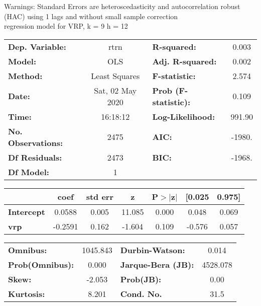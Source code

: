 Warnings: \newline
 [1] Standard Errors are heteroscedasticity and autocorrelation robust (HAC) using 1 lags and without small sample correction\\ 

regression model for VRP, k = 9 h = 12\begin{center}
\begin{tabular}{lclc}
\toprule
\textbf{Dep. Variable:}    &       rtrn       & \textbf{  R-squared:         } &     0.003   \\
\textbf{Model:}            &       OLS        & \textbf{  Adj. R-squared:    } &     0.002   \\
\textbf{Method:}           &  Least Squares   & \textbf{  F-statistic:       } &     2.574   \\
\textbf{Date:}             & Sat, 02 May 2020 & \textbf{  Prob (F-statistic):} &    0.109    \\
\textbf{Time:}             &     16:18:12     & \textbf{  Log-Likelihood:    } &    991.90   \\
\textbf{No. Observations:} &        2475      & \textbf{  AIC:               } &    -1980.   \\
\textbf{Df Residuals:}     &        2473      & \textbf{  BIC:               } &    -1968.   \\
\textbf{Df Model:}         &           1      & \textbf{                     } &             \\
\bottomrule
\end{tabular}
\begin{tabular}{lcccccc}
                   & \textbf{coef} & \textbf{std err} & \textbf{z} & \textbf{P$> |$z$|$} & \textbf{[0.025} & \textbf{0.975]}  \\
\midrule
\textbf{Intercept} &       0.0588  &        0.005     &    11.085  &         0.000        &        0.048    &        0.069     \\
\textbf{vrp}       &      -0.2591  &        0.162     &    -1.604  &         0.109        &       -0.576    &        0.057     \\
\bottomrule
\end{tabular}
\begin{tabular}{lclc}
\textbf{Omnibus:}       & 1045.843 & \textbf{  Durbin-Watson:     } &    0.014  \\
\textbf{Prob(Omnibus):} &   0.000  & \textbf{  Jarque-Bera (JB):  } & 4528.078  \\
\textbf{Skew:}          &  -2.053  & \textbf{  Prob(JB):          } &     0.00  \\
\textbf{Kurtosis:}      &   8.201  & \textbf{  Cond. No.          } &     31.5  \\
\bottomrule
\end{tabular}
\end{center}

